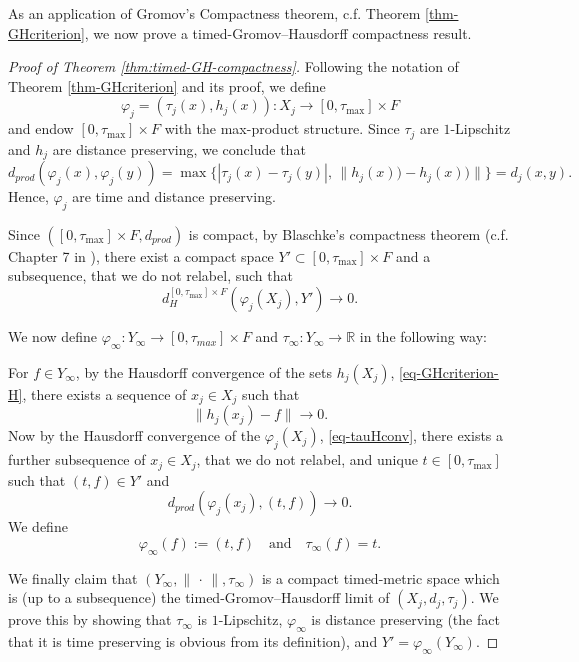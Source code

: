 \documentclass[a4paper,12pt,reqno]{amsart}
\theoremstyle{plain}
\newcommand{\be}{\begin{equation}}
\newcommand{\ee}{\end{equation}}
\newcommand{\R}{\mathbb{R}}
\begin{document}
As an application of Gromov's Compactness theorem, c.f. 
Theorem \ref{thm-GHcriterion}, we now prove a timed-Gromov--Hausdorff compactness result. 





\begin{proof}[Proof of Theorem \ref{thm:timed-GH-compactness}]



Following the notation of Theorem  \ref{thm-GHcriterion} and its proof, we  define
\be
\varphi_j= (\tau_j(x), h_j(x)): X_j \to [0, \tau_{\max}] \times F
\ee
and endow $[0, \tau_{\max}] \times F$ with the max-product structure. 
Since $\tau_j$ are $1$-Lipschitz and $h_j$ are distance preserving, we conclude that
\be
d_{prod}(\varphi_j(x),\varphi_j(y))= 
\max\{ |\tau_j(x) - \tau_j(y)|, \, \|h_j(x)) - h_j(x))\| \}= d_j(x,y).
\ee
Hence, $\varphi_j$ are time and distance preserving. 

\medskip

Since $([0, \tau_{\max}] \times F, d_{prod})$ is compact, 
by Blaschke's compactness theorem (c.f. Chapter 7 in \cite{BBI}), there exist a compact space
$Y' \subset [0, \tau_{\max}] \times F$ 
and a subsequence, that we do not relabel, such that 
\begin{equation}\label{eq-tauHconv}
   d_H^{ [0, \tau_{\max}] \times F} (\varphi_j(X_j), Y')\to 0. 
\end{equation}

We now define 
$\varphi_\infty: Y_\infty \to [0,\tau_{max}]\times F$ and 
$\tau_\infty: Y_\infty \to \R$ in the following way: 





For $f\in Y_\infty$, by the Hausdorff convergence of the sets 
$h_j(X_j)$, \eqref{eq-GHcriterion-H},
there exists a sequence of 
$x_j \in X_j$ such that 
\be
\|h_j(x_j)-f\| \to 0.
\ee
Now by the Hausdorff convergence of the 
$\varphi_j(X_j)$, \eqref{eq-tauHconv},
there exists a further subsequence of $x_j \in X_j$, that we do not relabel, and unique $t \in [0,\tau_{\max}]$ such that 
$(t,f)\in Y'$ and
\be
d_{prod}(\varphi_j(x_j),(t,f)) \to 0.
\ee
We define
\be 
\varphi_\infty(f) :=(t,f) \quad \text{and} \quad \tau_\infty(f)=t. 
\ee

We finally claim that 
$(Y_\infty, \| \,\cdot\, \|, \tau_\infty)$ is 
a compact timed-metric space which is (up to a subsequence) the timed-Gromov--Hausdorff limit of 
$(X_j, d_j, \tau_j)$. 
We prove this by showing that $\tau_\infty$ is $1$-Lipschitz, $\varphi_\infty$ is distance preserving (the fact that it is time preserving is obvious from its definition), and $Y'=\varphi_\infty(Y_\infty)$. 


\end{proof}
\end{document}
